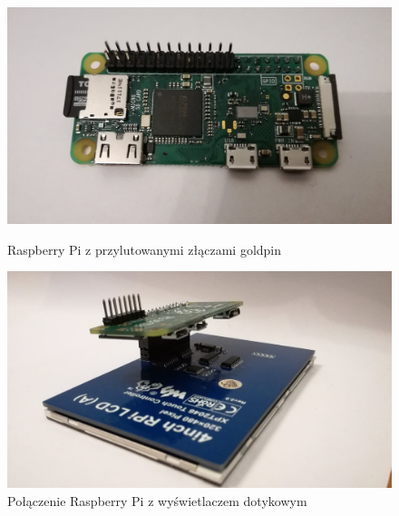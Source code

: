 \documentclass[12pt, eng, twoside, openany, final]{mgr}
\begin{document}
       
        \begin{figure}[!h]
        	\centering
        	\begin{minipage}[t]{5cm}
        		\centering
        		\includegraphics[scale=0.1]{rpi_goldpin.jpg}
        		\caption{Raspberry Pi z przylutowanymi złączami goldpin} \label{fig:rpi1} 
        	\end{minipage}
        	\hspace{3cm}
        	\begin{minipage}[t]{5cm}
        		\centering
        		\includegraphics[scale=0.1]{rpi_lcd.jpg}
        		\caption{Połączenie Raspberry Pi z wyświetlaczem dotykowym} \label{fig:rpi_lcd} 
        	\end{minipage}
        \end{figure}
        \newpage \noindent
\end{document}
